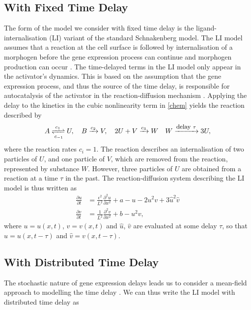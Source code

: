 \subsection{With Fixed Time Delay}

The form of the model we consider with fixed time delay is the ligand-internalisation (LI) variant of the standard Schnakenberg model. The LI model assumes that a reaction at the cell surface is followed by internalisation of a morphogen before the gene expression process can continue and morphogen production can occur \cite{leegaffney,yigaffneyli}. The time-delayed terms in the LI model only appear in the activator's dynamics. This is based on the assumption that the gene expression process, and thus the source of the time delay, is responsible for autocatalysis of the activator in the reaction-diffusion mechanism \cite{gaffmonk}. Applying the delay to the kinetics in the cubic nonlinearity term \cite{baker} in \eqref{chem} yields the reaction described by
\begin{equation}\label{chem2}
A\xrightleftharpoons[c_{-1}]{c_1} U,\quad B\xrightarrow{c_2} V,\quad 2U+V\xrightarrow{c_3} W\quad W\xrightarrow{\text{\footnotesize delay } \tau}3U,
\end{equation}
where the reaction rates $c_i=1$. The reaction describes an internalisation of two particles of $U$, and one particle of $V$, which are removed from the reaction, represented by substance $W$. However, three particles of $U$ are obtained from a reaction at a time $\tau$ in the past. The reaction-diffusion system describing the LI model is thus written as \cite{leegaffney}
\begin{equation}\label{fixed}
  \begin{split}
  \frac{\partial u}{\partial t}&=\frac{\epsilon^2}{L^2}\frac{\partial^2u}{\partial x^2}+a-u-2u^2v+3\hat{u}^2\hat{v}\\
  \frac{\partial v}{\partial t}&=\frac{1}{L^2}\frac{\partial^2v}{\partial x^2}+b-u^2v,
\end{split}
\end{equation}
where $u=u(x,t)$, $v=v(x,t)$ and $\hat{u}$, $\hat{v}$ are evaluated at some delay $\tau$, so that $\hat{u}=u(x,t-\tau)$ and $\hat{v}=v(x,t-\tau)$.

\subsection{With Distributed Time Delay}

The stochastic nature of gene expression delays leads us to consider a mean-field approach to modelling the time delay \cite{bratsun,krausenew}. We can thus write the LI model with distributed time delay as

